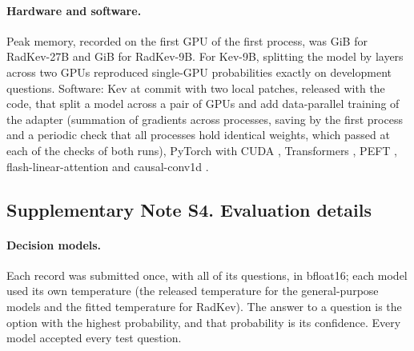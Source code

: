 \documentclass[11pt]{article}
\begin{document}
\paragraph{Hardware and software.} Peak memory, recorded on the first GPU of the first process, was  GiB for RadKev-27B and  GiB for RadKev-9B. For Kev-9B, splitting the model by layers across two GPUs reproduced single-GPU probabilities exactly on  development questions. Software: Kev at commit  with two local patches, released with the code, that split a model across a pair of GPUs and add data-parallel training of the adapter (summation of gradients across processes, saving by the first process and a periodic check that all processes hold identical weights, which passed at each of the  checks of both runs), PyTorch  with CUDA , Transformers , PEFT , flash-linear-attention  and causal-conv1d .

\FloatBarrier
\subsection*{Supplementary Note S4. Evaluation details}

\paragraph{Decision models.} Each record was submitted once, with all of its questions, in bfloat16; each model used its own temperature (the released temperature for the general-purpose models and the fitted temperature for RadKev). The answer to a question is the option with the highest probability, and that probability is its confidence. Every model accepted every test question.
\end{document}

